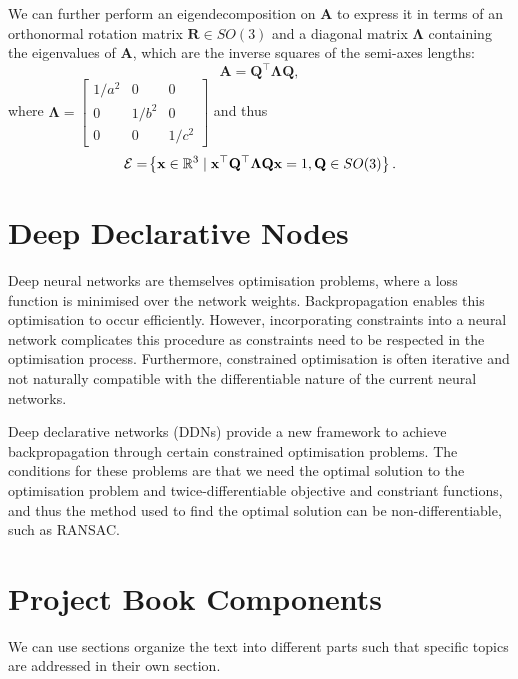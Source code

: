 \documentclass{project-logbook}
\begin{document}
We can further perform an eigendecomposition on $\mathbf A$ to express it in terms of an orthonormal rotation matrix $\mathbf R \in SO(3)$ and a diagonal matrix $\mathbf \Lambda$ containing the eigenvalues of $\mathbf A$, which are the inverse squares of the semi-axes lengths:
\begin{equation}
	\mathbf A = \mathbf Q^\top \mathbf\Lambda \mathbf Q,
\end{equation}
where $\mathbf \Lambda = \begin{bmatrix}
	1/a^2 & 0 & 0 \\
	0 & 1/b^2 & 0 \\
	0 & 0 & 1/c^2
\end{bmatrix}$
and thus 
\begin{equation}
	\mathcal E  = \!\left\{ \mathbf x \in \mathbb{R}^3 \mid \mathbf x^\top \mathbf Q^\top \mathbf\Lambda \mathbf Q \mathbf x = 1, \mathbf Q \in SO(3) \right\}.
\end{equation}


\section{Deep Declarative Nodes} \label{sec:ddn}
Deep neural networks are themselves optimisation problems, where a loss function is minimised over the network weights. Backpropagation enables this optimisation to occur efficiently. However, incorporating constraints into a neural network complicates this procedure as constraints need to be respected in the optimisation process. Furthermore, constrained optimisation is often iterative and not naturally compatible with the differentiable nature of the current neural networks.

Deep declarative networks (DDNs) provide a new framework to achieve backpropagation through certain constrained optimisation problems. The conditions for these problems are that we need the optimal solution to the optimisation problem and twice-differentiable objective and constriant functions, and thus the method used to find the optimal solution can be non-differentiable, such as RANSAC.

\section{Project Book Components} \label{sec:topic_B}

	We can use sections organize the text into different parts  such that specific topics are addressed in their own section.
\end{document}
